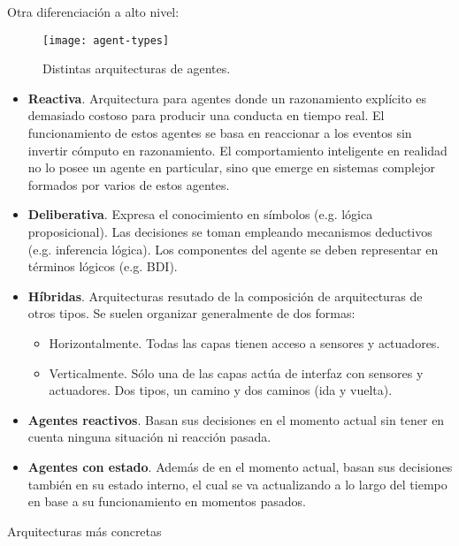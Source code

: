 Otra diferenciación a alto nivel:


\begin{figure}
	\texttt{[image: agent-types]}
	\caption{Distintas arquitecturas de agentes. }
	\label{fig:agent-types}
\end{figure}


\begin{itemize}
	\item \textbf{Reactiva}. Arquitectura para agentes donde un razonamiento explícito es demasiado costoso para producir una conducta en tiempo real. El funcionamiento de estos agentes se basa en reaccionar a los eventos sin invertir cómputo en razonamiento. El comportamiento inteligente en realidad no lo posee un agente en particular, sino que emerge en sistemas complejor formados por varios de estos agentes.
	\item \textbf{Deliberativa}. Expresa el conocimiento en símbolos (e.g. lógica proposicional). Las decisiones se toman empleando mecanismos deductivos (e.g. inferencia lógica). Los componentes del agente se deben representar en términos lógicos (e.g. BDI).
	\item \textbf{Híbridas}. Arquitecturas resutado de la composición de arquitecturas de otros tipos. Se suelen organizar generalmente de dos formas:
	\begin{itemize}
		\item Horizontalmente. Todas las capas tienen acceso a sensores y actuadores.
		\item Verticalmente. Sólo una de las capas actúa de interfaz con sensores y actuadores. Dos tipos, un camino y dos caminos (ida y vuelta).
	\end{itemize}
\end{itemize}

\begin{itemize}
	\item \textbf{Agentes reactivos}. Basan sus decisiones en el momento actual sin tener en cuenta ninguna situación ni reacción pasada.
	\item \textbf{Agentes con estado}. Además de en el momento actual, basan sus decisiones también en su estado interno, el cual se va actualizando a lo largo del tiempo en base a su funcionamiento en momentos pasados.
\end{itemize}

Arquitecturas más concretas

